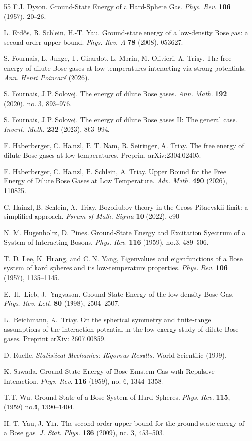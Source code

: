\documentclass[a4paper,11pt]{article}
\numberwithin{equation}{section}
\begin{document}
\begin{thebibliography}{55}
F.J. Dyson. Ground-State Energy of a Hard-Sphere Gas. {\it Phys. Rev.} {\bf 106} (1957), 20--26. \bibskip

L. Erd\H os, B. Schlein, H.-T. Yau. Ground-state energy of a low-density Bose gas: a second order upper bound. {\it Phys. Rev. A} {\bf 78} (2008), 053627. \bibskip

S. Fournais, L. Junge, T. Girardot, L. Morin, M. Olivieri, A. Triay. The free energy of dilute Bose gases at low temperatures interacting via strong potentials. {\it Ann. Henri Poincaré} (2026).\bibskip


S. Fournais, J.P. Solovej. The energy of dilute Bose gases. {\it Ann. Math.} {\bf 192} (2020), no. 3, 893--976.  \bibskip

S. Fournais, J.P. Solovej. The energy of dilute Bose gases II: The general case.
{\it Invent. Math.} {\bf 232} (2023), 863--994. \bibskip

 F. Haberberger, C. Hainzl, P. T. Nam, R. Seiringer, A. Triay. The free energy of dilute Bose gases at low temperatures. Preprint arXiv:2304.02405. \bibskip

 F. Haberberger, C. Hainzl, B. Schlein, A. Triay. Upper Bound for the Free Energy of Dilute Bose Gases at Low Temperature. {\it Adv. Math.} {\bf 490} (2026), 110825. \bibskip

 C. Hainzl, B. Schlein, A. Triay. Bogoliubov theory in the Gross-Pitaevskii limit: a simplified approach. {\it Forum of Math. Sigma} {\bf 10} (2022), e90. \bibskip


N. M. Hugenholtz, D. Pines. Ground-State Energy and Excitation Syectrum of a
System of Interacting Bosons. {\it Phys. Rev.} {\bf 116} (1959), no.3,  489–506. 
\bibskip

T. D. Lee, K. Huang, and C. N. Yang, Eigenvalues and eigenfunctions of a Bose
system of hard spheres and its low-temperature properties. {\it Phys. Rev.} {\bf 106} (1957), 1135--1145. \bibskip


E.~H.~Lieb, J.~Yngvason. Ground State Energy of the low density Bose Gas. {\it Phys. Rev. Lett.} {\bf 80} (1998), 2504--2507.   \bibskip

L.~Reichmann, A.~Triay. On the spherical symmetry and finite-range assumptions of the interaction potential in the low energy study of dilute Bose gases. Preprint arXiv: 2607.00859. \bibskip


 D. Ruelle. {\it Statistical Mechanics: Rigorous Results.} World Scientific (1999). \bibskip

K. Sawada. Ground-State Energy of Bose-Einstein Gas with Repulsive Interaction. {\it Phys. Rev.} {\bf 116} (1959), no. 6,  1344--1358. \bibskip

T.T. Wu. Ground State of a Bose System of Hard Spheres. {\it Phys. Rev.} {\bf 115}, (1959) no.6, 1390--1404.  \bibskip

H.-T. Yau, J. Yin. The second order upper bound for the ground state energy of a Bose gas. {\it J. Stat. Phys.} {\bf 136} (2009), no. 3, 453--503. \bibskip

\end{thebibliography}
 
\end{document}
